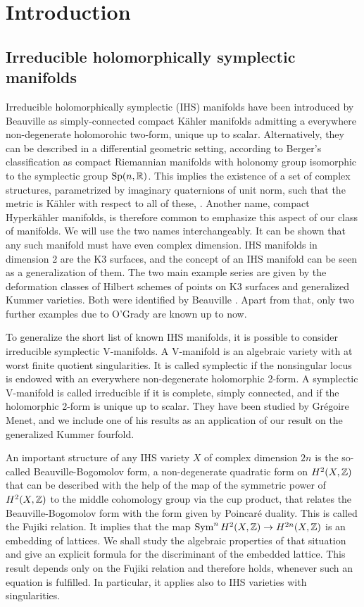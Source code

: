 \section{Introduction}
\subsection{Irreducible holomorphically symplectic manifolds}
Irreducible holomorphically symplectic (IHS) manifolds have been introduced by Beauville \cite{Beauville} as simply-connected compact K\"ahler manifolds admitting a everywhere non-degenerate holomorohic two-form, unique up to scalar. 
Alternatively, they can be described in a differential geometric setting, according to Berger's classification as compact Riemannian manifolds with holonomy group isomorphic to the symplectic group $\operatorname{Sp}(n,\mathbb{R})$. This implies the existence of a set of complex structures, parametrized by imaginary quaternions of unit norm, such that the metric is K\"ahler with respect to all of these, \cite[Sect~.23]{Huybrechts}. 
Another name, compact Hyperk\"ahler manifolds, is therefore common to emphasize this aspect of our class of manifolds. We will use the two names interchangeably.
It can be shown that any such manifold must have even complex dimension. IHS manifolds in dimension 2 are the K3 surfaces, and the concept of an IHS manifold can be seen as a generalization of them. The two main example series are given by the deformation classes of Hilbert schemes of points on K3 surfaces and generalized Kummer varieties. Both were identified by Beauville \cite{Beauville}. Apart from that, only two further examples due to O'Grady are known up to now.

To generalize the short list of known IHS manifolds, it is possible to consider irreducible symplectic V-manifolds. A V-manifold is an algebraic variety with at worst finite quotient singularities. It is called symplectic if the nonsingular locus is endowed with an everywhere non-degenerate holomorphic 2-form. 
A symplectic V-manifold is called irreducible if it is complete, simply connected, and if the holomorphic 2-form is unique up to scalar. They have been studied by Gr\'egoire Menet, and we include one of his results as an application of our result on the generalized Kummer fourfold.

An important structure of any IHS variety $X$ of complex dimension $2n$ is the so-called Beauville-Bogomolov form, a non-degenerate quadratic form on $H^2(X,\mathbb{Z})$ that can be described with the help of the map of the symmetric power of $H^2(X,\mathbb{Z})$ to the middle cohomology group via the cup product, that relates the Beauville-Bogomolov form with the form given by Poincar\'e duality. This is called the Fujiki relation. It implies that the map $\operatorname{Sym}^n H^2(X,\mathbb{Z})\rightarrow H^{2n}(X,\mathbb{Z})$ is an embedding of lattices. We shall study the algebraic properties of that situation and give an explicit formula for the discriminant of the embedded lattice. This result depends only on the Fujiki relation and therefore holds, whenever such an equation is fulfilled. In particular, it applies also to IHS varieties with singularities.

